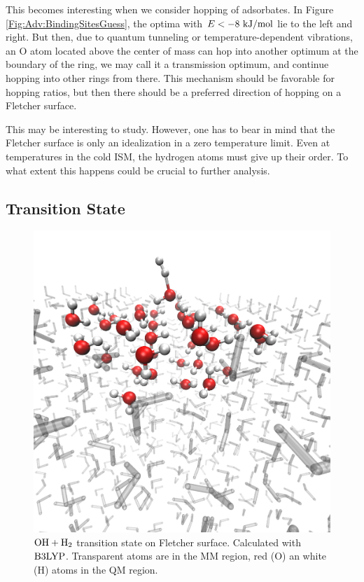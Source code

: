 
This becomes interesting when we consider hopping of adsorbates. In
Figure \ref{Fig:Adv:BindingSitesGuess}, the optima with $E<-8~\text {kJ/mol}$ lie to the
left and right. But then, due to quantum tunneling or temperature-dependent
vibrations, an O atom located above the center of mass can hop into another
optimum at the boundary of the ring, we may call it a transmission optimum, and
continue hopping into other rings from there. This mechanism should be
favorable for hopping ratios, but then there should be a preferred direction
of hopping on a Fletcher surface.

This may be interesting to study. However, one has to bear in mind that the
Fletcher surface is only an idealization in a zero temperature limit. Even at
temperatures in the cold ISM, the hydrogen atoms must give up their order. To
what extent this happens could be crucial to further analysis.


\subsection{Transition State}
\label{Sec:Adv:Trans}
\newcommand\hoht{\mbox{\enmat{\ho+\htw}}}

\begin{figure}[t!]
\centering
\includegraphics[width=.7\textwidth]{./img/FletcherAdsorption.png}
\caption{$\hoht$ transition state on Fletcher surface. Calculated with $\text{B3LYP}$.
Transparent atoms are in the MM region, red (O) an white (H) atoms in the QM
region.}
\label{Fig:Adv:TS}
\end{figure}

